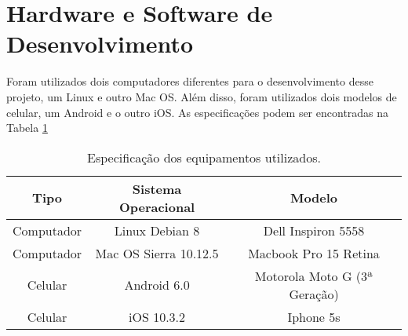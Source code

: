 \section{Hardware e Software de Desenvolvimento}

Foram utilizados dois computadores diferentes para o desenvolvimento desse projeto, um Linux e outro Mac OS. Além disso, foram utilizados dois modelos de celular, um Android e o outro iOS. As especificações podem ser encontradas na Tabela \ref{tab-hardware}

\begin{table}[h]
    \centering
    \caption{Especificação dos equipamentos utilizados.}
    \label{tab-hardware}
    \begin{tabular}{|c|c|c|}\hline
        \textbf{Tipo} & \textbf{Sistema Operacional} & \textbf{Modelo}              \\ \hline
        Computador    & Linux Debian 8               & Dell Inspiron 5558           \\ \hline
        Computador    & Mac OS Sierra 10.12.5         & Macbook Pro 15 Retina        \\ \hline
        Celular       & Android 6.0                  & Motorola Moto G (3ª Geração) \\ \hline
        Celular       & iOS 10.3.2                   & Iphone 5s                    \\ \hline
    \end{tabular}
\end{table}
